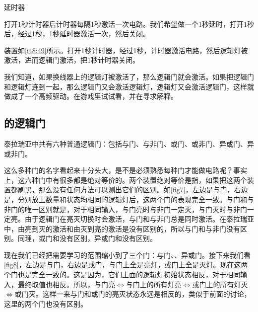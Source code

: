 \begin{example}{延时器}{}

打开1秒计时器后计时器每隔1秒激活一次电路。我们希望做一个1秒延时，打开1秒后，经过1秒，1秒延时器激活一次，然后关闭。

装置如\autoref{i48:49}所示。打开1秒计时器，经过1秒，计时器激活电路，然后逻辑灯被激活，进而逻辑门激活，把1秒计时器关闭。

\begin{figure}[H]
\centering
{}%
%
\caption{}
\label{i48:49}
\end{figure}
\end{example}

\begin{example}{}{}

我们知道，如果换线器上的逻辑灯被激活了，那么逻辑门就会激活。如果把逻辑门和逻辑灯连到一起，那么逻辑门又会激活逻辑灯，逻辑灯又会激活逻辑门，这样就做成了一个高频驱动。在游戏里试试看，并在寻求解释。
\end{example}

\subsection{的逻辑门}
泰拉瑞亚中共有六种普通逻辑门：包括与门、与非门、或门、或非门、异或门、异或非门。

\begin{figure}[!ht]
\centering
{}%
%
\caption{}
\end{figure}

这么多种门的名字看起来十分头大，是不是必须熟悉每种门才能做电路呢？事实上，这六种门中有很多都是绝对等价的。两个装置绝对等价是指，如果把这两个装置都刷黑，那么没有任何方法可以测出它们的区别。如\autoref{fig7}，左边是与门，右边是，分别放上数量和状态均相同的逻辑灯后，这两个门的表现完全一致。与门和与非门的唯一区别就是，对于相同输入，与门亮时与非门一定灭，与门灭时与非门一定亮。由于逻辑门在亮灭切换时会激活，与门和与非门总是同时激活。在泰拉瑞亚中，由亮到灭的激活和由灭到亮的激活是没有区别的，所以与门和与非门没有区别。同理，或门和没有区别，异或门和没有区别。

现在我们已经把需要学习的范围缩小到了三个门：与门、、异或门。接下来我们看\autoref{fig8}，左边是与门，右边是或门，与门上全是亮灯，或门上全是灭灯。现在这两个门也是完全一致的。这是因为，它们上面的逻辑灯初始状态相反，对于相同输入，最终取值也相反。所以，与门亮$\Longleftrightarrow$与门上的所有灯亮$\Longleftrightarrow$或门上的所有灯灭$\Longleftrightarrow$或门灭。这样一来与门和或门的亮灭状态永远是相反的，类似于前面的讨论，这里的两个门也没有区别。

